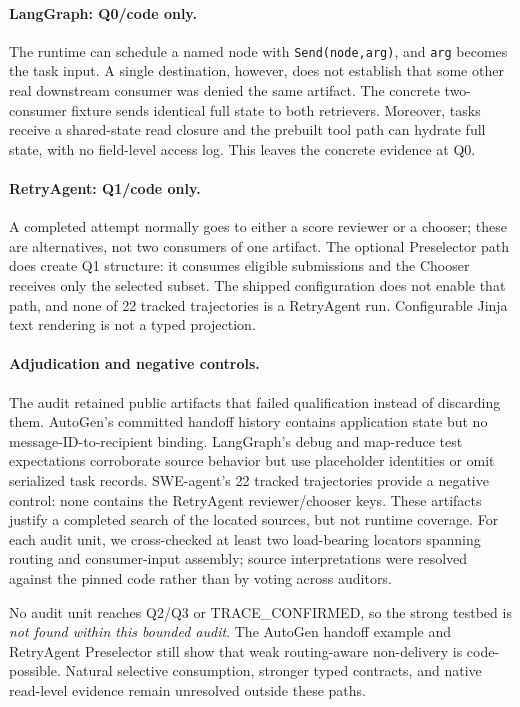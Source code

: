 \documentclass[letterpaper]{article} %
\begin{document}
\paragraph{LangGraph: Q0/code only.}
The runtime can schedule a named node with \texttt{Send(node,arg)}, and
\texttt{arg} becomes the task input. A single destination, however, does not
establish that some other real downstream consumer was denied the same
artifact. The concrete two-consumer fixture sends identical full state to both
retrievers. Moreover, tasks receive a shared-state read closure and the
prebuilt tool path can hydrate full state, with no field-level access log.
This leaves the concrete evidence at Q0.

\paragraph{RetryAgent: Q1/code only.}
A completed attempt normally goes to either a score reviewer or a chooser;
these are alternatives, not two consumers of one artifact. The optional
Preselector path does create Q1 structure: it consumes eligible submissions
and the Chooser receives only the selected subset. The shipped configuration
does not enable that path, and none of 22 tracked trajectories is a RetryAgent
run. Configurable Jinja text rendering is not a typed projection.

\paragraph{Adjudication and negative controls.}
The audit retained public artifacts that failed qualification instead of
discarding them. AutoGen's committed handoff history contains application
state but no message-ID-to-recipient binding. LangGraph's debug and map-reduce
test expectations corroborate source behavior but use placeholder identities
or omit serialized task records. SWE-agent's 22 tracked trajectories provide a
negative control: none contains the RetryAgent reviewer/chooser keys. These
artifacts justify a completed search of the located sources, but not runtime
coverage. For each audit unit, we cross-checked at least two load-bearing
locators spanning routing and consumer-input
assembly; source interpretations were resolved against the pinned code rather
than by voting across auditors.

No audit unit reaches Q2/Q3 or TRACE\_CONFIRMED, so the strong testbed is
\emph{not found within this bounded audit}. The AutoGen handoff example and
RetryAgent Preselector still show that weak routing-aware non-delivery is
code-possible. Natural selective consumption, stronger typed contracts, and
native read-level evidence remain unresolved outside these paths.
\end{document}
